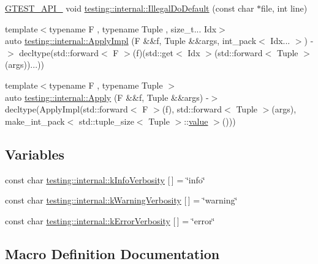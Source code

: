 \begin{DoxyCompactItemize}
\item 
\mbox{\hyperlink{_obj__test_2lib_2googletest-release-1_88_81_2googletest_2include_2gtest_2internal_2gtest-port_8h_aa73be6f0ba4a7456180a94904ce17790}{G\+T\+E\+S\+T\+\_\+\+A\+P\+I\+\_\+}} void \mbox{\hyperlink{namespacetesting_1_1internal_aa67e1e9d28122eedffbb7b6636824f2d}{testing\+::internal\+::\+Illegal\+Do\+Default}} (const char $\ast$file, int line)
\item 
{\footnotesize template$<$typename F , typename Tuple , size\+\_\+t... Idx$>$ }\\auto \mbox{\hyperlink{namespacetesting_1_1internal_a3a3b201170370a28f0acaf0de785cded}{testing\+::internal\+::\+Apply\+Impl}} (F \&\&f, Tuple \&\&args, int\+\_\+pack$<$ Idx... $>$) -\/$>$ decltype(std\+::forward$<$ F $>$(f)(std\+::get$<$ Idx $>$(std\+::forward$<$ Tuple $>$(args))...))
\item 
{\footnotesize template$<$typename F , typename Tuple $>$ }\\auto \mbox{\hyperlink{namespacetesting_1_1internal_aa4d652d33ef1ce203c40ebe2d3ca6b1b}{testing\+::internal\+::\+Apply}} (F \&\&f, Tuple \&\&args) -\/$>$ decltype(Apply\+Impl(std\+::forward$<$ F $>$(f), std\+::forward$<$ Tuple $>$(args), make\+\_\+int\+\_\+pack$<$ std\+::tuple\+\_\+size$<$ Tuple $>$\+::\mbox{\hyperlink{_obj__test_2lib_2googletest-master_2googlemock_2test_2gmock-matchers__test_8cc_a337b8a670efc0b086ad3af163f3121b6}{value}} $>$()))
\end{DoxyCompactItemize}
\subsection*{Variables}
\begin{DoxyCompactItemize}
\item 
const char \mbox{\hyperlink{namespacetesting_1_1internal_a4f283e16e52a86b5d719a6d13dcec602}{testing\+::internal\+::k\+Info\+Verbosity}} \mbox{[}$\,$\mbox{]} = \char`\"{}info\char`\"{}
\item 
const char \mbox{\hyperlink{namespacetesting_1_1internal_aa5e3dfc43abf98b8fa8aa864cd208103}{testing\+::internal\+::k\+Warning\+Verbosity}} \mbox{[}$\,$\mbox{]} = \char`\"{}warning\char`\"{}
\item 
const char \mbox{\hyperlink{namespacetesting_1_1internal_af23bb61931365f262993225a3d2aef57}{testing\+::internal\+::k\+Error\+Verbosity}} \mbox{[}$\,$\mbox{]} = \char`\"{}error\char`\"{}
\end{DoxyCompactItemize}


\subsection{Macro Definition Documentation}
\mbox{\label{googletest-master_2googlemock_2include_2gmock_2internal_2gmock-internal-utils_8h_a7d8a1871d7a30543a4e1882a8b2bbcd8}} 
